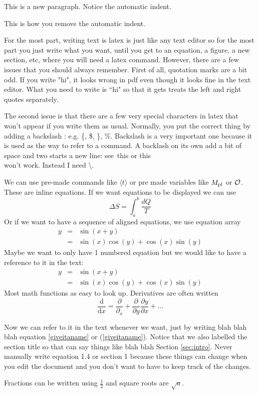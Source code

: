 \documentclass[11pt]{article}
\numberwithin{equation}{section}
\def\beq{\begin{equation}}
\def\eeq{\end{equation}}
\def\bea{\begin{eqnarray}}
\def\eea{\end{eqnarray}}
\def\cO{{\cal O}}
\def\Mp{M_{\rm pl}}
\newcommand{\vev}[1]{\langle #1 \rangle}
\begin{document}
This is a new paragraph.  Notice the automatic indent.

\noindent This is how you remove the automatic indent.

For the most part, writing text is latex is just like any text editor so for the most part you just write what you want, until you get to an equation, a figure, a new section, etc, where you will need a latex command.  However, there are a few issues that you should always remember.  First of all, quotation marks are a bit odd.  If you write "hi", it looks wrong in pdf even though it looks fine in the text editor.  What you need to write is ``hi" so that it gets treats the left and right quotes separately.

The second issue is that there are a few very special characters in latex that won't appear if you write them as usual.  Normally, you put the correct thing by adding a backslash : e.g. \{, \$, \}, \%.  Backslash is a very important one because it is used as the way to refer to a command.  A backlash on its own add a bit of space and two starts a new line: see\ this or this\\ won't work.  Instead I need \textbackslash.

We can use  pre-made commands like $\vev{t}$ or pre made variables like $\Mp$ or $\cO$.  These are inline equations.  If we want equations to be displayed we can use
\beq
\Delta S = \int_a^b \frac{d Q}{T}
\eeq
Or if we want to have a sequence of aligned equations, we use equation array
\bea
y&=&\sin(x+y) \\
&=& \sin(x) \cos(y)+ \cos(x) \sin(y)
\eea
Maybe we want to only have 1 numbered equation but we would like to have a reference to it in the text:\
\bea
y&=&\sin(x+y) \nonumber \\
&=& \sin(x) \cos(y)+ \cos(x) \sin(y) \label{giveitaname}
\eea
Most math functions as easy to look up.  Derivatives are often written
\beq
\frac{\mathrm d}{\mathrm d x} = \frac{\partial}{\partial_x} + \frac{\partial}{\partial y} \frac{\partial y}{\partial x} + \ldots
\eeq

Now we can refer to it in the text whenever we want, just by writing blah blah blah equation \ref{giveitaname} or (\ref{giveitaname}).  Notice that we also labelled the section title so that can say things like blah blah Section \ref{sec:intro}.  Never manually write equation 1.4 or section 1 because these things can change when you edit the document and you don't want to have to keep track of the changes.

Fractions can be written using $\frac{1}{2}$ and square roots are $\sqrt{a}$.
\end{document}
